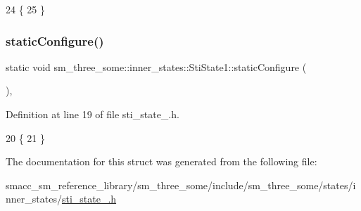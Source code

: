\begin{DoxyCode}
24   \{
25   \}
\end{DoxyCode}
\mbox{\label{structsm__three__some_1_1inner__states_1_1StiState1_a1caa7fccefcc671ace99ebecc534007f}} 
\subsubsection{\texorpdfstring{static\+Configure()}{staticConfigure()}}
{\footnotesize\ttfamily static void sm\+\_\+three\+\_\+some\+::inner\+\_\+states\+::\+Sti\+State1\+::static\+Configure (\begin{DoxyParamCaption}{ }\end{DoxyParamCaption})\hspace{0.3cm}{\ttfamily [inline]}, {\ttfamily [static]}}



Definition at line 19 of file sti\+\_\+state\+\_.\+h.


\begin{DoxyCode}
20   \{
21   \}
\end{DoxyCode}


The documentation for this struct was generated from the following file\+:\begin{DoxyCompactItemize}
\item 
smacc\+\_\+sm\+\_\+reference\+\_\+library/sm\+\_\+three\+\_\+some/include/sm\+\_\+three\+\_\+some/states/inner\+\_\+states/\hyperlink{sti__state__1_8h}{sti\+\_\+state\+\_.\+h}\end{DoxyCompactItemize}
